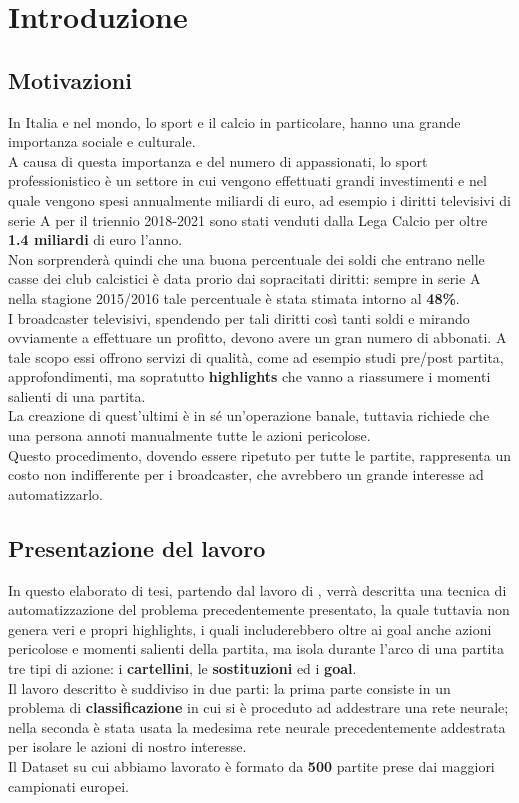 \chapter{Introduzione}\label{ch:introduzione}
\section*{Motivazioni}
In Italia e nel mondo, lo sport e il calcio in particolare, hanno una grande importanza sociale e culturale.
\\A causa di questa importanza e del numero di appassionati, lo sport professionistico è un settore in cui vengono effettuati grandi investimenti e nel quale vengono spesi annualmente miliardi di euro, ad esempio i diritti televisivi di serie A per il triennio 2018-2021 sono stati venduti dalla Lega Calcio per oltre \textbf{1.4 miliardi} di euro l'anno. \cite{DirittiTriennio2018-21}
\\Non sorprenderà quindi che una buona percentuale dei soldi che entrano nelle casse dei club calcistici è data prorio dai sopracitati diritti: sempre in serie A nella stagione 2015/2016 tale percentuale è stata stimata intorno al \textbf{48\%}. \cite{impattoDirittiTv}
\\I broadcaster televisivi, spendendo per tali diritti così tanti soldi e mirando ovviamente a effettuare un profitto, devono avere un gran numero di abbonati. A tale scopo essi offrono servizi di qualità, come ad esempio studi pre/post partita, approfondimenti, ma sopratutto \textbf{highlights} che vanno a riassumere i momenti salienti di una partita. 
\\La creazione di quest'ultimi è in sé un'operazione banale, tuttavia richiede che una persona annoti manualmente tutte le azioni pericolose.
\\Questo procedimento, dovendo essere ripetuto per tutte le partite, rappresenta un costo non indifferente per i broadcaster, che avrebbero un grande interesse ad automatizzarlo.
\section*{Presentazione del lavoro}
In questo elaborato di tesi, partendo dal lavoro di \citet{soccerNet} , verrà descritta una tecnica di automatizzazione del problema precedentemente presentato, la quale tuttavia non genera veri e propri highlights, i quali includerebbero oltre ai goal anche azioni pericolose e momenti salienti della partita, ma isola durante l'arco di una partita tre tipi di azione: i \textbf{cartellini}, le \textbf{sostituzioni} ed i \textbf{goal}.
\\Il lavoro descritto è suddiviso in due parti: la prima parte consiste in un problema di \textbf{classificazione} in cui si è proceduto ad addestrare una rete neurale; nella seconda è stata usata la medesima rete neurale precedentemente addestrata per isolare le azioni di nostro interesse.
\\Il Dataset su cui abbiamo lavorato è formato da \textbf{500} partite prese dai maggiori campionati europei.


